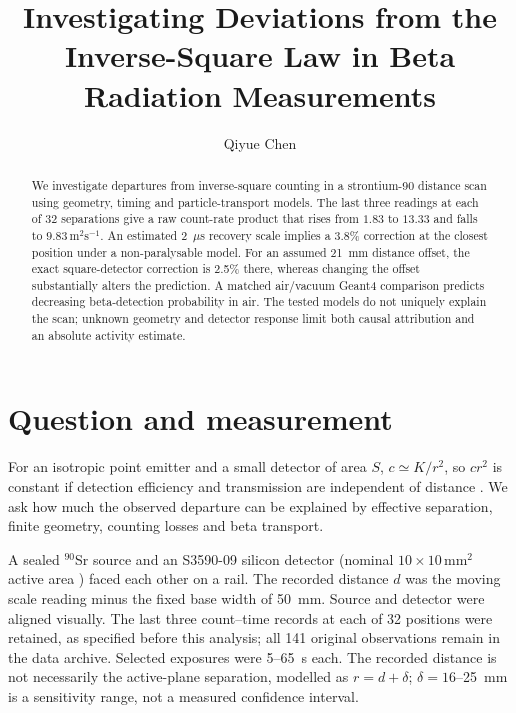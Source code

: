 \documentclass[journal,a4paper]{Imperial_lab_report}
\begin{document}
\title{Investigating Deviations from the Inverse-Square Law in Beta Radiation Measurements}
\author{Qiyue Chen}
\maketitle
\begin{abstract}
We investigate departures from inverse-square counting in a strontium-90 distance scan using geometry, timing and particle-transport models. The last three readings at each of 32 separations give a raw count-rate product that rises from $1.83$ to $13.33$ and falls to $9.83\,\mathrm{m^2s^{-1}}$. An estimated 2~$\mu$s recovery scale implies a 3.8\% correction at the closest position under a non-paralysable model. For an assumed 21~mm distance offset, the exact square-detector correction is 2.5\% there, whereas changing the offset substantially alters the prediction. A matched air/vacuum Geant4 comparison predicts decreasing beta-detection probability in air. The tested models do not uniquely explain the scan; unknown geometry and detector response limit both causal attribution and an absolute activity estimate.
\end{abstract}
\section{Question and measurement}
For an isotropic point emitter and a small detector of area $S$, $c\simeq K/r^2$, so $cr^2$ is constant if detection efficiency and transmission are independent of distance \cite{script}. We ask how much the observed departure can be explained by effective separation, finite geometry, counting losses and beta transport.

A sealed $^{90}$Sr source and an S3590-09 silicon detector (nominal $10\times10\,\mathrm{mm^2}$ active area \cite{sensor}) faced each other on a rail. The recorded distance $d$ was the moving scale reading minus the fixed base width of 50~mm. Source and detector were aligned visually. The last three count--time records at each of 32 positions were retained, as specified before this analysis; all 141 original observations remain in the data archive. Selected exposures were 5--65~s each. The recorded distance is not necessarily the active-plane separation, modelled as $r=d+\delta$; $\delta=16$--25~mm is a sensitivity range, not a measured confidence interval.
\end{document}
